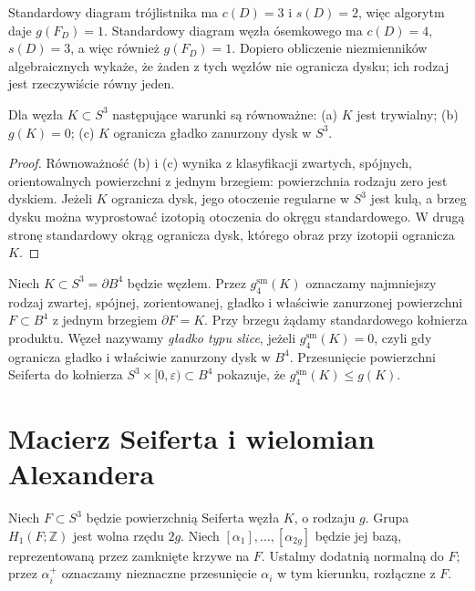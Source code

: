 \begin{przyklad}
Standardowy diagram trójlistnika ma $c(D)=3$ i $s(D)=2$,
więc algorytm daje $g(F_D)=1$. Standardowy diagram węzła
ósemkowego ma $c(D)=4$, $s(D)=3$, a więc również $g(F_D)=1$.
Dopiero obliczenie niezmienników algebraicznych wykaże, że
żaden z tych węzłów nie ogranicza dysku; ich rodzaj jest
rzeczywiście równy jeden.
\end{przyklad}

\begin{stwierdzenie}
Dla węzła $K\subset S^3$ następujące warunki są równoważne:
(a) $K$ jest trywialny; (b) $g(K)=0$; (c) $K$ ogranicza
gładko zanurzony dysk w $S^3$.
\end{stwierdzenie}

\begin{proof}
Równoważność (b) i (c) wynika z klasyfikacji zwartych,
spójnych, orientowalnych powierzchni z jednym brzegiem:
powierzchnia rodzaju zero jest dyskiem. Jeżeli $K$ ogranicza
dysk, jego otoczenie regularne w $S^3$ jest kulą, a brzeg
dysku można wyprostować izotopią otoczenia do okręgu standardowego.
W drugą stronę standardowy okrąg ogranicza dysk, którego obraz
przy izotopii ogranicza $K$.
\end{proof}

\begin{definicja}
\label{def:kt-four-ball-genus}
Niech $K\subset S^3=\partial B^4$ będzie węzłem.
Przez $g_4^{\mathrm{sm}}(K)$ oznaczamy najmniejszy rodzaj
zwartej, spójnej, zorientowanej, gładko i właściwie
zanurzonej powierzchni $F\subset B^4$ z jednym brzegiem
$\partial F=K$. Przy brzegu żądamy standardowego
kołnierza produktu. Węzeł nazywamy
\emph{gładko typu slice}, jeżeli
$g_4^{\mathrm{sm}}(K)=0$, czyli gdy ogranicza
gładko i właściwie zanurzony dysk w $B^4$.
Przesunięcie powierzchni Seiferta do kołnierza
$S^3\times[0,\varepsilon)\subset B^4$
pokazuje, że $g_4^{\mathrm{sm}}(K)\le g(K)$.
\end{definicja}

\section{Macierz Seiferta i wielomian Alexandera}
\label{sec:kt-alexander}

Niech $F\subset S^3$ będzie powierzchnią Seiferta węzła $K$,
o rodzaju $g$. Grupa $H_1(F;\mathbb Z)$ jest wolna rzędu $2g$.
Niech $[\alpha_1],\dots,[\alpha_{2g}]$ będzie jej bazą,
reprezentowaną przez zamknięte krzywe na $F$. Ustalmy dodatnią
normalną do $F$; przez $\alpha_i^+$ oznaczamy nieznaczne
przesunięcie $\alpha_i$ w tym kierunku, rozłączne z $F$.


